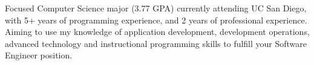 
\begin{cvparagraph}
Focused Computer Science major (3.77 GPA) currently attending UC San Diego, with
5+ years of programming experience, and 2 years of professional experience.
Aiming to use my knowledge of application development, development operations,
advanced technology and instructional programming skills to fulfill your Software
Engineer position.
\end{cvparagraph}
